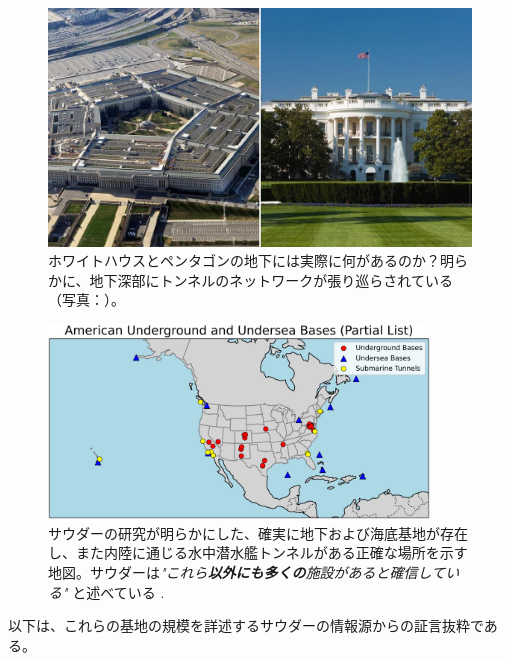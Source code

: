 \documentclass[10pt,twocolumn,letterpaper]{article}
\begin{document}
\begin{figure}[b]
\begin{center}
   \includegraphics[width=1\linewidth]{penta.jpg}
\end{center}
   \caption{ホワイトハウスとペンタゴンの地下には実際に何があるのか？明らかに、地下深部にトンネルのネットワークが張り巡らされている（写真：\cite{31}）。}
\label{fig:3}
\label{fig:onecol}
\end{figure}
\begin{figure}[t]
\begin{center}
\includegraphics[width=0.9\textwidth]{basescrop.png}
\end{center}
   \caption{サウダーの研究が明らかにした、確実に地下および海底基地が存在し、また内陸に通じる水中潜水艦トンネルがある正確な場所を示す地図。サウダーは\textit{"これら\textbf{以外にも多くの}施設があると確信している"} と述べている \cite{22}.}
   \label{fig:4}
\end{figure}

以下は、これらの基地の規模を詳述するサウダーの情報源からの証言抜粋である。
\end{document}

